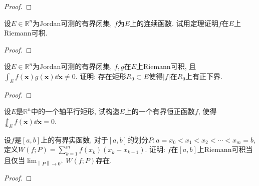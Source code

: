 \begin{quiza}
\begin{proof}
\end{proof}
\woe 设\(E\in\mathbb{R}^n\)为Jordan可测的有界闭集, \(f\)为\(E\)上的连续函数. 试用定理证明\(f\)在\(E\)上Riemann可积.
\begin{proof}
	
\end{proof}
\woe 设\(E\in\mathbb{R}^n\)为Jordan可测的有界闭集, \(f,g\)在\(E\)上Riemann可积, 且\(\int_Ef(\boldsymbol{x})g(\boldsymbol{x})\dd\boldsymbol{x}\ne 0\). 证明: 存在矩形\(R_0\subset E\)使得\(|f|\)在\(R_0\)上有正下界.
\begin{proof}
	
\end{proof}
\woe 设\(E\)是\(\mathbb{R}^n\)中的一个轴平行矩形, 试构造\(E\)上的一个有界恒正函数\(f\), 使得\(\lowint_Ef(\boldsymbol{x})\dd\boldsymbol{x}=0\).
\begin{solution}
	
\end{solution}
\end{quiza}
\begin{quizb}
\woe 设\(f\)是\([a,b]\)上的有界实函数, 对于\([a,b]\)的划分\(P:a=x_0<x_1<x_2<\cdots<x_m=b\), 定义\(W(f;P)=\sum_{k=1}^{m}f(x_k)(x_{k}-x_{k-1})\). 证明: \(f\)在\([a,b]\)上Riemann可积当且仅当\(\lim_{\left\|P\right\|\rightarrow 0^+ }W(f;P)\)存在.
\begin{proof}
	
\end{proof}
\end{quizb}
